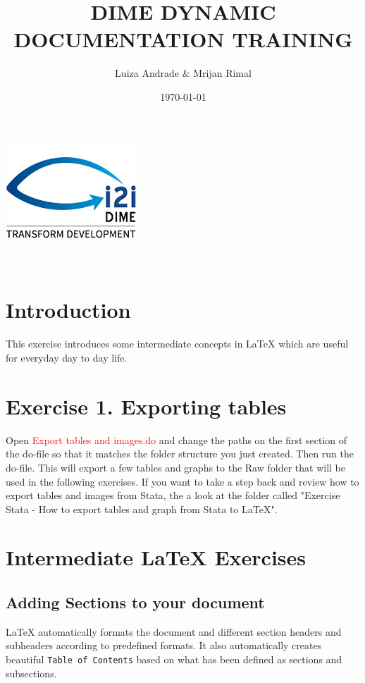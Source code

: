 \documentclass[12pts]{report}
\title{DIME DYNAMIC DOCUMENTATION TRAINING }
\author{Luiza Andrade \& Mrijan Rimal}
\date{\today}
\begin{document}
	
	
	\makeatletter
	\begin{titlepage}
		\begin{center}
			\includegraphics[width=0.3\linewidth]{../img/i2i.png}\\[10ex]
			{\LARGE \bfseries  \@title }\\[2ex] 
			{\Large  \@author}\\[20ex] 
			{\large \@date}
		\end{center}
	\end{titlepage}
	\makeatother
	
\section*{Introduction}
This exercise introduces some intermediate concepts in {\LaTeX} which are useful for everyday day to day life. 

\section*{Exercise 1. Exporting tables}
Open \textcolor{red}{Export tables and images.do} and change the paths on the first section of the do-file so that it matches the folder structure you just created. Then run the do-file. This will export a few tables and graphs to the Raw folder that will be used in the following exercises. If you want to take a step back and review how to export tables and images from Stata, the a look at the folder called "Exercise Stata - How to export tables and graph from Stata to LaTeX".

\section*{Intermediate {\LaTeX} Exercises}
\subsection*{Adding Sections to your document}
{\LaTeX} automatically formats the document and different section headers and subheaders according to predefined formats. It also automatically creates beautiful \texttt{Table of Contents} based on what has been defined as sections and subsections. 
\end{document}
